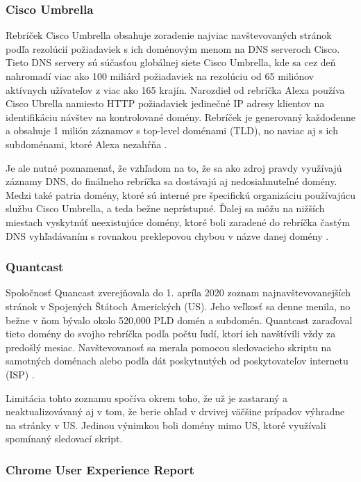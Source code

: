 \subsubsection{Cisco Umbrella}

Rebríček Cisco Umbrella obsahuje zoradenie najviac navštevovaných stránok podľa rezolúcií požiadaviek s ich doménovým menom na DNS serveroch Cisco.
Tieto DNS servery sú súčasťou globálnej siete Cisco Umbrella, kde sa cez deň nahromadí viac ako 100 miliárd požiadaviek na rezolúciu od 65 miliónov aktívnych užívateľov z viac ako 165 krajín.
Narozdiel od rebríčka Alexa používa Cisco Ubrella namiesto HTTP požiadaviek jedinečné IP adresy klientov na identifikáciu návštev na kontrolované domény.
Rebríček je generovaný každodenne a obsahuje 1 milión záznamov s top-level doménami (TLD), no naviac aj s ich subdoménami, ktoré Alexa nezahŕňa \cite{cisco-umbrella}.

Je ale nutné poznamenať, že vzhľadom na to, že sa ako zdroj pravdy využívajú záznamy DNS, do finálneho rebríčka sa dostávajú aj nedosiahnuteľné domény.
Medzi také patria domény, ktoré sú interné pre špecifickú organizáciu používajúcu službu Cisco Umbrella, a teda bežne neprístupné.
Ďalej sa môžu na nižších miestach vyskytnúť neexistujúce domény, ktoré boli zaradené do rebríčka častým DNS vyhľadávaním s rovnakou preklepovou chybou v názve danej domény \cite{tranco-methodology}.

\subsubsection{Quantcast}

Spoločnosť Quancast zverejňovala do 1. apríla 2020 zoznam najnavštevovanejších stránok v Spojených Štátoch Amerických (US). Jeho veľkosť sa denne menila, no bežne v ňom bývalo
okolo 520,000 PLD domén a subdomén. Quantcast zaraďoval tieto domény do svojho rebríčka podľa počtu ľudí, ktorí ich navštívili vždy za predošlý mesiac.
Navštevovanosť sa merala pomocou sledovacieho skriptu na samotných doménach alebo podľa dát poskytnutých od poskytovateľov internetu (ISP) \cite{tranco-methodology}.

Limitácia tohto zoznamu spočíva okrem toho, že už je zastaraný a neaktualizovávaný aj v tom, že berie ohľad v drvivej väčšine prípadov výhradne na stránky v US.
Jedinou výnimkou boli domény mimo US, ktoré využívali spomínaný sledovací skript. 

\subsubsection{Chrome User Experience Report}

